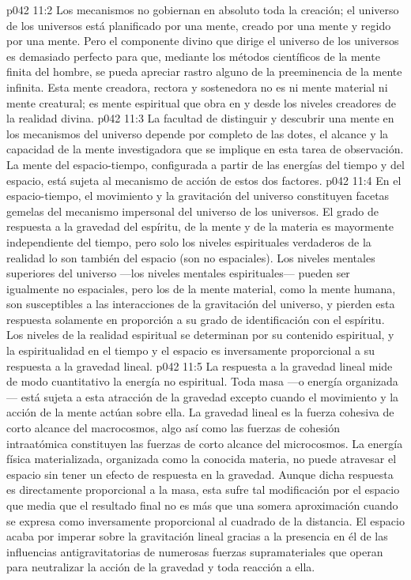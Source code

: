 \vs p042 11:2 \pc Los mecanismos no gobiernan en absoluto toda la creación; el universo de los universos  está planificado por una mente, creado por una mente y regido por una mente. Pero el componente divino que dirige el universo de los universos es demasiado perfecto para que, mediante los métodos científicos de la mente finita del hombre, se pueda apreciar rastro alguno de la preeminencia de la mente infinita. Esta mente creadora, rectora y sostenedora no es ni mente material ni mente creatural; es mente espiritual que obra en y desde los niveles creadores de la realidad divina.
\vs p042 11:3 La facultad de distinguir y descubrir una mente en los mecanismos del universo depende por completo de las dotes, el alcance y la capacidad de la mente investigadora que se implique en esta tarea de observación. La mente del espacio\hyp{}tiempo, configurada a partir de las energías del tiempo y del espacio, está sujeta al mecanismo de acción de estos dos factores.
\vs p042 11:4 \pc En el espacio\hyp{}tiempo, el movimiento y la gravitación del universo constituyen facetas gemelas del mecanismo impersonal del universo de los universos. El grado de respuesta a la gravedad del espíritu, de la mente y de la materia es mayormente independiente del tiempo, pero solo los niveles espirituales verdaderos de la realidad lo son también del espacio (son no espaciales). Los niveles mentales superiores del universo ---los niveles mentales espirituales--- pueden ser igualmente no espaciales, pero los de la mente material, como la mente humana, son susceptibles a las interacciones de la gravitación del universo, y pierden esta respuesta solamente en proporción a su grado de identificación con el espíritu. Los niveles de la realidad espiritual se determinan por su contenido espiritual, y la espiritualidad en el tiempo y el espacio es inversamente proporcional a su respuesta a la gravedad lineal.
\vs p042 11:5 La respuesta a la gravedad lineal mide de modo cuantitativo la energía no espiritual. Toda masa ---o energía organizada--- está sujeta a esta atracción de la gravedad excepto cuando el movimiento y la acción de la mente actúan sobre ella. La gravedad lineal es la fuerza cohesiva de corto alcance del macrocosmos, algo así como las fuerzas de cohesión intraatómica constituyen las fuerzas de corto alcance del microcosmos. La energía física materializada, organizada como la conocida materia, no puede atravesar el espacio sin tener un efecto de respuesta en la gravedad. Aunque dicha respuesta es directamente proporcional a la masa, esta sufre tal modificación por el espacio que media que el resultado final no es más que una somera aproximación cuando se expresa como inversamente proporcional al cuadrado de la distancia. El espacio acaba por imperar sobre la gravitación lineal gracias a la presencia en él de las influencias antigravitatorias de numerosas fuerzas supramateriales que operan para neutralizar la acción de la gravedad y toda reacción a ella.
